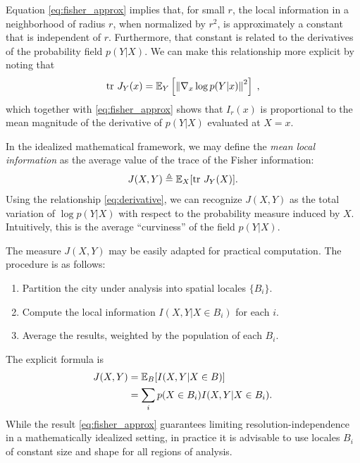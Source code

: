 \documentclass[english]{scrartcl}
\begin{document}
		Equation \eqref{eq:fisher_approx} implies that, for small $r$, the local information in a neighborhood of radius $r$, when normalized by $r^2$, is approximately a constant that is independent of $r$. Furthermore, that constant is related to the derivatives of the probability field $p(Y|X)$. We can make this relationship more explicit by noting that 
		\begin{equation}
			\text{tr }J_Y(x) = \mathbb{E}_Y\left[\left\lVert\nabla_x \log p(Y|x)\right\rVert^2\right]\;, \label{eq:derivative}
		\end{equation}
		which together with \eqref{eq:fisher_approx} shows that $I_r(x)$ is proportional to the mean magnitude of the derivative of $p(Y|X)$ evaluated at $X = x$.

		In the idealized mathematical framework, we may define the \emph{mean local information} as the average value of the trace of the Fisher information: 
		\begin{equation*}
			J(X,Y) \triangleq \mathbb{E}_X[\text{tr } J_Y(X)].
		\end{equation*}
		Using the relationship \eqref{eq:derivative}, we can recognize $J(X,Y)$ as the total variation of $\log p(Y|X)$ with respect to the probability measure induced by $X$. Intuitively, this is the average ``curviness'' of the field $p(Y|X)$. 

		The measure $J(X,Y)$ may be easily adapted for practical computation. The procedure is as follows:
		\begin{enumerate}
		 	\item Partition the city under analysis into spatial locales $\{B_i\}$.
		 	\item Compute the local information $I(X,Y|X \in B_i)$ for each $i$. 
		 	\item Average the results, weighted by the population of each $B_i$. 
		\end{enumerate} 
		The explicit formula is 
		\begin{align}
			J(X,Y) &= \mathbb{E}_B[I(X,Y|X \in B)] \\ 
			       &= \sum_i p(X \in B_i) I(X,Y|X \in B_i). \label{eq:formula}
		\end{align}
		While the result \eqref{eq:fisher_approx} guarantees limiting resolution-independence in a mathematically idealized setting, in practice it is advisable to use locales $B_i$ of constant size and shape for all regions of analysis. 
	
\end{document}
